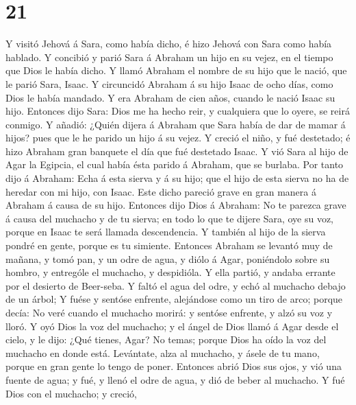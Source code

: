 \hypertarget{section-20}{%
\section{21}\label{section-20}}

 Y visitó Jehová á Sara, como había dicho, é hizo Jehová
con Sara como había hablado.  Y concibió y parió Sara á
Abraham un hijo en su vejez, en el tiempo que Dios le había dicho.
 Y llamó Abraham el nombre de su hijo que le nació, que le
parió Sara, Isaac.  Y circuncidó Abraham á su hijo Isaac
de ocho días, como Dios le había mandado.  Y era Abraham
de cien años, cuando le nació Isaac su hijo.  Entonces
dijo Sara: Dios me ha hecho reir, y cualquiera que lo oyere, se reirá
conmigo.  Y añadió: ¿Quién dijera á Abraham que Sara había
de dar de mamar á hijos? pues que le he parido un hijo á su vejez.
 Y creció el niño, y fué destetado; é hizo Abraham gran
banquete el día que fué destetado Isaac.  Y vió Sara al
hijo de Agar la Egipcia, el cual había ésta parido á Abraham, que se
burlaba.  Por tanto dijo á Abraham: Echa á esta sierva y
á su hijo; que el hijo de esta sierva no ha de heredar con mi hijo, con
Isaac.  Este dicho pareció grave en gran manera á Abraham
á causa de su hijo.  Entonces dijo Dios á Abraham: No te
parezca grave á causa del muchacho y de tu sierva; en todo lo que te
dijere Sara, oye su voz, porque en Isaac te será llamada descendencia.
 Y también al hijo de la sierva pondré en gente, porque
es tu simiente.  Entonces Abraham se levantó muy de
mañana, y tomó pan, y un odre de agua, y diólo á Agar, poniéndolo sobre
su hombro, y entrególe el muchacho, y despidióla. Y ella partió, y
andaba errante por el desierto de Beer-seba.  Y faltó el
agua del odre, y echó al muchacho debajo de un árbol;  Y
fuése y sentóse enfrente, alejándose como un tiro de arco; porque decía:
No veré cuando el muchacho morirá: y sentóse enfrente, y alzó su voz y
lloró.  Y oyó Dios la voz del muchacho; y el ángel de
Dios llamó á Agar desde el cielo, y le dijo: ¿Qué tienes, Agar? No
temas; porque Dios ha oído la voz del muchacho en donde está.
 Levántate, alza al muchacho, y ásele de tu mano, porque
en gran gente lo tengo de poner.  Entonces abrió Dios sus
ojos, y vió una fuente de agua; y fué, y llenó el odre de agua, y dió de
beber al muchacho.  Y fué Dios con el muchacho; y creció,
